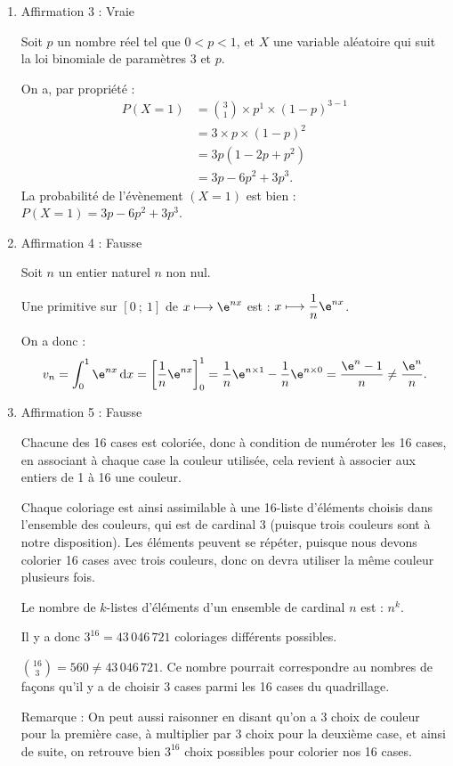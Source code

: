\begin{enumerate}
\begin{itemize}
\item Conclusion : On a montré que l'affirmation $P_0$ est vraie, et que pour un $n$ entier naturel, si $P_n$ est vraie, alors $P_{n+1}$ est vraie.
\end{itemize}

En vertu du principe de récurrence, on en déduit que, pour tout entier naturel $n$, l'affirmation est vraie, et donc on a établi une expression explicite du terme général de la suite $(w_n)$ :
\[
\forall n\in\N,\quad w_n=(n+1)^2.
\]

\item Affirmation 3 : Vraie

Soit $p$ un nombre réel tel que $0<p<1$, et $X$ une variable aléatoire qui suit la loi binomiale de paramètres 3 et $p$.

On a, par propriété :
\[
\begin{aligned}
P(X=1)&=\binom31\times p^1\times (1-p)^{3-1}\\
&=3\times p\times (1-p)^2\\
&=3p(1-2p+p^2)\\
&=3p-6p^2+3p^3.
\end{aligned}
\]
La probabilité de l'évènement $(X=1)$ est bien : $P(X=1)=3p-6p^2+3p^3$.

\item Affirmation 4 : Fausse

Soit $n$ un entier naturel $n$ non nul.

Une primitive sur $[0~;~1]$ de $x\longmapsto \e^{nx}$ est : $x\longmapsto \dfrac1n\e^{nx}$.

On a donc :
\[
v_n=\int_0^1 \e^{nx}\,\mathrm{d}x=\left[\dfrac1n\e^{nx}\right]_0^1=\dfrac1n\e^{n\times 1}-\dfrac1n\e^{n\times 0}=\dfrac{\e^n-1}{n}\neq \dfrac{\e^n}{n}.
\]

\item Affirmation 5 : Fausse

Chacune des 16 cases est coloriée, donc à condition de numéroter les 16 cases, en associant à chaque case la couleur utilisée, cela revient à associer aux entiers de 1 à 16 une couleur.

Chaque coloriage est ainsi assimilable à une 16-liste d'éléments choisis dans l'ensemble des couleurs, qui est de cardinal 3 (puisque trois couleurs sont à notre disposition). Les éléments peuvent se répéter, puisque nous devons colorier 16 cases avec trois couleurs, donc on devra utiliser la même couleur plusieurs fois.

Le nombre de $k$-listes d'éléments d'un ensemble de cardinal $n$ est : $n^k$.

Il y a donc $3^{16}=43\,046\,721$ coloriages différents possibles.

$\binom{16}{3}=560\neq 43\,046\,721$. Ce nombre pourrait correspondre au nombres de façons qu'il y a de choisir 3 cases parmi les 16 cases du quadrillage.

Remarque : On peut aussi raisonner en disant qu'on a 3 choix de couleur pour la première case, à multiplier par 3 choix pour la deuxième case, et ainsi de suite, on retrouve bien $3^{16}$ choix possibles pour colorier nos 16 cases.
\end{enumerate}
